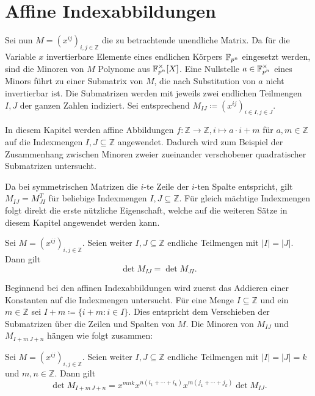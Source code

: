 \section{Affine Indexabbildungen} \label{sec:indextransformationen}

Sei nun $M = \left( x^{ij} \right)_{i,j \in \mathbb{Z}}$ die zu betrachtende unendliche Matrix. Da für die Variable $x$ invertierbare Elemente eines endlichen Körpers $\field{p}[n]$ eingesetzt werden, sind die Minoren von $M$ Polynome aus $\field{p}[n]^\times [X]$. Eine Nullstelle $a \in \field{p}[n]^\times$ eines Minors führt zu einer Submatrix von $M$, die nach Substitution von $a$ nicht invertierbar ist. Die Submatrizen werden mit jeweils zwei endlichen Teilmengen $I,J$ der ganzen Zahlen indiziert. Sei entsprechend $M_{IJ} \coloneqq \left( x^{ij} \right)_{i \in I,j \in J}$.

In diesem Kapitel werden affine Abbildungen $f:\mathbb{Z} \rightarrow \mathbb{Z}, i \mapsto a\cdot i + m$ für $a,m \in \mathbb{Z}$ auf die Indexmengen $I,J \subseteq \mathbb{Z}$ angewendet. Dadurch wird zum Beispiel der Zusammenhang zwischen Minoren zweier zueinander verschobener quadratischer Submatrizen untersucht.

Da bei symmetrischen Matrizen die $i$-te Zeile der $i$-ten Spalte entspricht, gilt $M_{IJ} = M_{JI}^T$ für beliebige Indexmengen $I,J \subseteq \mathbb{Z}$. Für gleich mächtige Indexmengen folgt direkt die erste nützliche Eigenschaft, welche auf die weiteren Sätze in diesem Kapitel angewendet werden kann.

\begin{lemma}
    Sei $M = \left( x^{ij} \right)_{i,j \in \mathbb{Z}}$. Seien weiter $I,J \subseteq \mathbb{Z}$ endliche Teilmengen mit $|I|=|J|$. Dann gilt
    \begin{equation*}
        \det{} M_{IJ} = \det M_{JI}.
    \end{equation*}
\end{lemma}

Beginnend bei den affinen Indexabbildungen wird zuerst das Addieren einer Konstanten auf die Indexmengen untersucht. Für eine Menge $I \subseteq \mathbb{Z}$ und ein $m \in \mathbb{Z}$ sei $I+m \coloneqq \{i+m:i\in I\}$. Dies entspricht dem Verschieben der Submatrizen über die Zeilen und Spalten von $M$. Die Minoren von $M_{IJ}$ und $M_{I+m\,J+n}$ hängen wie folgt zusammen:

\begin{satz} \label{satz:translation}
    \sloppy Sei $M = \left( x^{ij} \right)_{i,j \in \mathbb{Z}}$. Seien weiter $I,J \subseteq \mathbb{Z}$ endliche Teilmengen mit ${|I|=|J|=k}$ und $m,n \in \mathbb{Z}$. Dann gilt
    \begin{equation*}
        \det{} M_{I+m\,J+n} = x^{mnk} x^{n(i_1+\cdots +i_k)} x^{m(j_1 +\cdots + j_k)} \det{} M_{IJ}.
    \end{equation*}
\end{satz}

